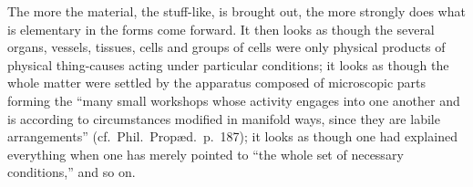 \documentclass[12pt,a4paper]{book}
\begin{document}

The more the material, the stuff-like, is brought out, the more strongly does
what is elementary in the forms come forward. It then looks as though the
several organs, vessels, tissues, cells and
\setcounter{footnote}{0}
groups of cells were only physical products of physical thing-causes acting
under particular conditions; it looks as though the whole matter were settled
by the apparatus composed of microscopic parts forming the ``many small
workshops whose activity engages into one another and is according to
circumstances modified in manifold ways, since they are labile arrangements''
(cf.\ Phil.\ Propæd.\ p.~187); it looks as though one had explained everything
when one has merely pointed to ``the whole set of necessary conditions,'' and so
on.
\end{document}
